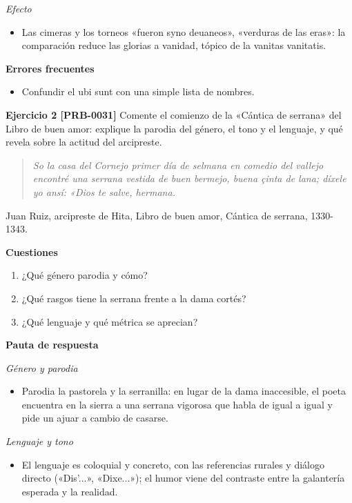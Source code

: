 \documentclass{book}
\begin{document}
\noindent\textit{Efecto}
\begin{itemize}
\item Las cimeras y los torneos «fueron syno deuaneos», «verduras de las eras»: la comparación reduce las glorias a vanidad, tópico de la vanitas vanitatis.
\end{itemize}

\noindent\textbf{Errores frecuentes}
\begin{itemize}
\item Confundir el ubi sunt con una simple lista de nombres.
\end{itemize}

\noindent\textbf{Ejercicio 2 [PRB-0031]}
Comente el comienzo de la «Cántica de serrana» del Libro de buen amor: explique la parodia del género, el tono y el lenguaje, y qué revela sobre la actitud del arcipreste.


\begin{quote}
\itshape So la casa del Cornejo primer día de selmana en comedio del vallejo encontré una serrana vestida de buen bermejo, buena çinta de lana; díxele yo ansí: «Dios te salve, hermana.
\end{quote}
{\noindent\footnotesize Juan Ruiz, arcipreste de Hita, Libro de buen amor, Cántica de serrana, 1330-1343.\par}

\noindent\textbf{Cuestiones}
\begin{enumerate}
\item ¿Qué género parodia y cómo?
\item ¿Qué rasgos tiene la serrana frente a la dama cortés?
\item ¿Qué lenguaje y qué métrica se aprecian?
\end{enumerate}

\noindent\textbf{Pauta de respuesta}

\noindent\textit{Género y parodia}
\begin{itemize}
\item Parodia la pastorela y la serranilla: en lugar de la dama inaccesible, el poeta encuentra en la sierra a una serrana vigorosa que habla de igual a igual y pide un ajuar a cambio de casarse.
\end{itemize}

\noindent\textit{Lenguaje y tono}
\begin{itemize}
\item El lenguaje es coloquial y concreto, con las referencias rurales y diálogo directo («Dis'...», «Dixe...»); el humor viene del contraste entre la galantería esperada y la realidad.
\end{itemize}
\end{document}
